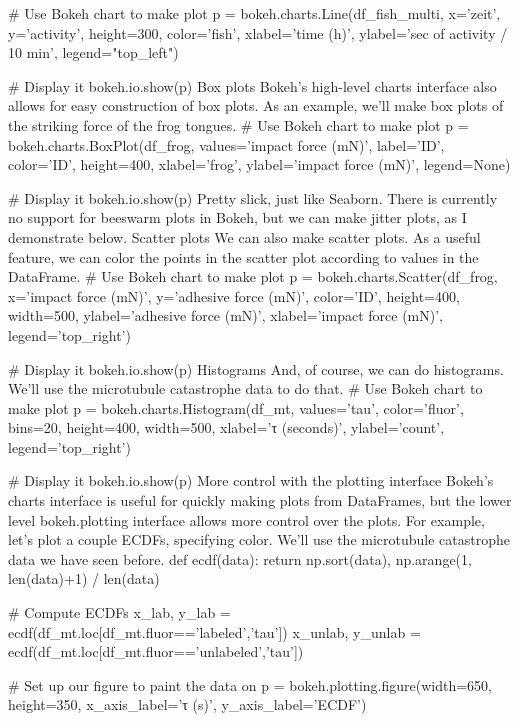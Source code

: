 # Use Bokeh chart to make plot
p = bokeh.charts.Line(df_fish_multi, x='zeit', y='activity', height=300,
                      color='fish', xlabel='time (h)', 
                      ylabel='sec of activity / 10 min', legend="top_left")

# Display it
bokeh.io.show(p)
Box plots
Bokeh's high-level charts interface also allows for easy construction of box plots. As an example, we'll make box plots of the striking force of the frog tongues.
# Use Bokeh chart to make plot
p = bokeh.charts.BoxPlot(df_frog, values='impact force (mN)', label='ID',
                        color='ID', height=400, xlabel='frog', 
                        ylabel='impact force (mN)', legend=None)

# Display it
bokeh.io.show(p)
Pretty slick, just like Seaborn. There is currently no support for beeswarm plots in Bokeh, but we can make jitter plots, as I demonstrate below.
Scatter plots
We can also make scatter plots. As a useful feature, we can color the points in the scatter plot according to values in the DataFrame.
# Use Bokeh chart to make plot
p = bokeh.charts.Scatter(df_frog, x='impact force (mN)', y='adhesive force (mN)',
                         color='ID', height=400, width=500,
                         ylabel='adhesive force (mN)', xlabel='impact force (mN)',
                         legend='top_right')

# Display it
bokeh.io.show(p)
Histograms
And, of course, we can do histograms. We'll use the microtubule catastrophe data to do that.
# Use Bokeh chart to make plot
p = bokeh.charts.Histogram(df_mt, values='tau', color='fluor',
                           bins=20, height=400, width=500, 
                           xlabel='τ (seconds)', ylabel='count',
                           legend='top_right')

# Display it
bokeh.io.show(p)
More control with the plotting interface
Bokeh's charts interface is useful for quickly making plots from DataFrames, but the lower level bokeh.plotting interface allows more control over the plots. For example, let's plot a couple ECDFs, specifying color. We'll use the microtubule catastrophe data we have seen before.
def ecdf(data):
    return np.sort(data), np.arange(1, len(data)+1) / len(data)

# Compute ECDFs
x_lab, y_lab = ecdf(df_mt.loc[df_mt.fluor=='labeled','tau'])
x_unlab, y_unlab = ecdf(df_mt.loc[df_mt.fluor=='unlabeled','tau'])

# Set up our figure to paint the data on
p = bokeh.plotting.figure(width=650, height=350, x_axis_label='τ (s)',
                          y_axis_label='ECDF')

